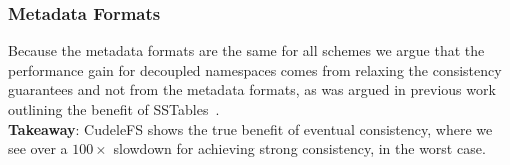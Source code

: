 \subsubsection{Metadata Formats} Because the metadata formats are the same for
all schemes we argue that the performance gain for decoupled namespaces comes
from relaxing the consistency guarantees and not from the metadata formats, as
was argued in previous work outlining the benefit of
SSTables~\cite{ren:atc2013-tablefs, ren:sc2014-indexfs}.\\

\noindent\textbf{Takeaway}: CudeleFS shows the true benefit of eventual
consistency, where we see over a \(100\times\) slowdown for achieving strong
consistency, in the worst case.

%
%
%
%
%
%
%
%
%
%
%

